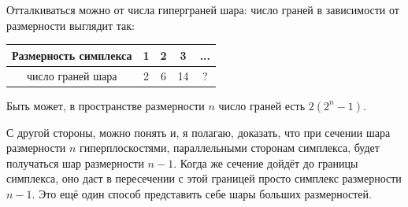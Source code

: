 \documentclass[12pt]{report}
\begin{document}
Отталкиваться можно от числа гиперграней шара: число граней в зависимости от размерности выглядит так:

\begin{center}
\begin{tabular}{|c|c|c|c|c|}
\hline
Размерность симплекса & 1 & 2 & 3 & ...\\
\hline
число граней шара & 2 & 6 & 14 & ? \\
\hline
\end{tabular}
\end{center}

Быть может, в пространстве размерности $n$ число граней есть $2 (2^n - 1)$. 

С другой стороны, можно понять и, я полагаю, доказать, что при сечении шара размерности $n$ гиперплоскостями, параллельными сторонам симплекса, будет получаться шар размерности $n - 1$. Когда же сечение дойдёт до границы симплекса, оно даст в пересечении с этой границей просто симплекс размерности $n-1$. Это ещё один способ представить себе шары больших размерностей.
\end{document}
